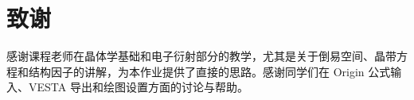 \section*{致\hspace{0.5em}谢}

感谢课程老师在晶体学基础和电子衍射部分的教学，尤其是关于倒易空间、晶带方程和结构因子的讲解，为本作业提供了直接的思路。感谢同学们在 Origin 公式输入、VESTA 导出和绘图设置方面的讨论与帮助。
